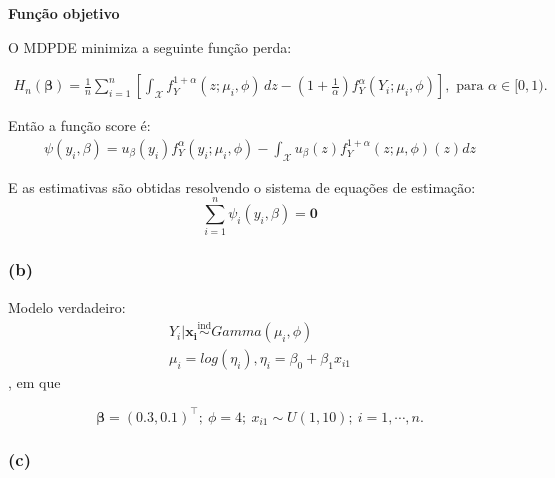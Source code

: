 \documentclass[
  letterpaper,
  DIV=11,
  numbers=noendperiod]{scrartcl}
\begin{document}
\textbf{Função objetivo}

O MDPDE minimiza a seguinte função perda:

\begin{align}\label{eq.1}
H_n(\boldsymbol{\beta}) = \frac{1}{n} \sum_{i=1}^n \left[ \int_{\mathcal{X}} f_Y^{1+\alpha}(z; \mu_i, \phi) \, dz - \left( 1 + \frac{1}{\alpha} \right) f_Y^\alpha(Y_i; \mu_i, \phi) \right], \text{ para } \alpha \in [0,1).
\end{align}

Então a função score é: \begin{align*}
\psi(y_i,\beta) = u_{\beta}(y_i) f_Y^{\alpha}(y_i;\mu_i, \phi)-\int_{\mathcal{X}}  u_{\beta}(z) f_Y^{1+\alpha}(z;\mu, \phi)(z)dz
\end{align*}

E as estimativas são obtidas resolvendo o sistema de equações de
estimação: \[\sum_{i=1}^n \psi_i(y_i, \beta) = \mathbf{0}\]

\subsubsection{(b)}\label{b}

Modelo verdadeiro: \begin{align*}
Y_i|\mathbf{x_i} \overset{\text{ind}}{\sim} Gamma (\mu_i, \phi) \\
\mu_i = log(\eta_i), \eta_i = \beta_0 + \beta_1 x_{i1}
\end{align*}, em que

\[\boldsymbol{\beta} = (0.3, 0.1)^\intercal;\ \phi=4;\ x_{i1} \sim U(1,10);\ i=1,\cdots,n. \]

\subsubsection{(c)}\label{c}
\end{document}
